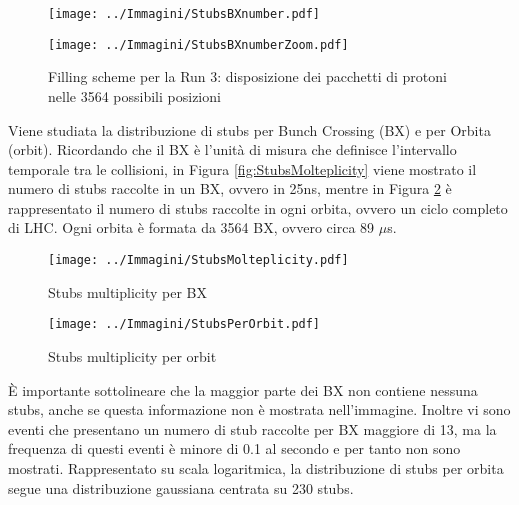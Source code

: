  \begin{figure}[t]
   \centering
   \begin{minipage}[b]{0.49\textwidth}
       \centering
       \texttt{[image: ../Immagini/StubsBXnumber.pdf]} 
     \end{minipage}
     \hfill 
     \begin{minipage}[b]{0.49\textwidth}
       \centering
       \texttt{[image: ../Immagini/StubsBXnumberZoom.pdf]} 
   \end{minipage}
   \caption{Filling scheme per la Run 3: disposizione dei pacchetti di protoni nelle 3564 possibili posizioni }
   \label{fig:Stubs1}
 \end{figure}


 Viene studiata la distribuzione di stubs per Bunch Crossing (BX) e per Orbita (orbit). Ricordando che il BX è l'unità di misura che definisce l'intervallo temporale tra le collisioni, in Figura \ref{fig:StubsMolteplicity} viene mostrato il numero di stubs raccolte in un BX, ovvero in 25ns, mentre in Figura \ref{fig:StubsPerOrbit} è rappresentato il numero di stubs raccolte in ogni orbita, ovvero un ciclo completo di LHC. Ogni orbita è formata da 3564 BX, ovvero circa 89 $\mu$s.

 \begin{figure}[b]
  \centering
  \begin{minipage}[b]{0.49\textwidth}
      \centering
      \texttt{[image: ../Immagini/StubsMolteplicity.pdf]} 
      \caption{Stubs multiplicity per BX}
      \label{fig:StubsMolteplicity}
    \end{minipage}
    \hfill 
    \begin{minipage}[b]{0.49\textwidth}
      \centering
      \texttt{[image: ../Immagini/StubsPerOrbit.pdf]} 
      \caption{Stubs multiplicity per orbit}
      \label{fig:StubsPerOrbit}
  \end{minipage}
\end{figure}


 È importante sottolineare che la maggior parte dei BX non contiene nessuna stubs, anche se questa informazione non è mostrata nell'immagine. Inoltre vi sono eventi che presentano un numero di stub raccolte per BX maggiore di 13, ma la frequenza di questi eventi è minore di 0.1 al secondo e per tanto non sono mostrati. \newline
 Rappresentato su scala logaritmica, la distribuzione di stubs per orbita segue una distribuzione gaussiana centrata su 230 stubs. 



